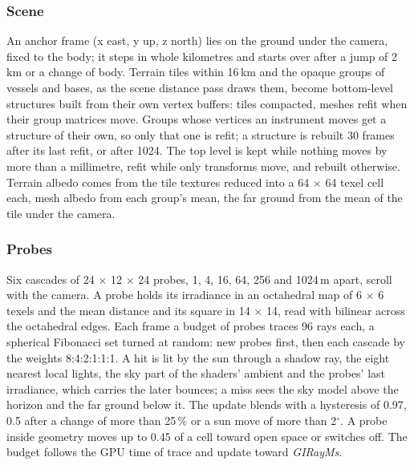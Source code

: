\documentclass[Orbiter Technical Reference.tex]{subfiles}
\begin{document}
\begin{sloppypar}
\subsubsection{Scene}
An anchor frame (x east, y up, z north) lies on the ground under the camera, fixed to the body; it steps in whole kilometres and starts over after a jump of 2\,km or a change of body. Terrain tiles within 16\,km and the opaque groups of vessels and bases, as the scene distance pass draws them, become bottom-level structures built from their own vertex buffers: tiles compacted, meshes refit when their group matrices move. Groups whose vertices an instrument moves get a structure of their own, so only that one is refit; a structure is rebuilt 30 frames after its last refit, or after 1024. The top level is kept while nothing moves by more than a millimetre, refit while only transforms move, and rebuilt otherwise. Terrain albedo comes from the tile textures reduced into a 64 $\times$ 64 texel cell each, mesh albedo from each group's mean, the far ground from the mean of the tile under the camera.

\subsubsection{Probes}
Six cascades of 24 $\times$ 12 $\times$ 24 probes, 1, 4, 16, 64, 256 and 1024\,m apart, scroll with the camera. A probe holds its irradiance in an octahedral map of 6 $\times$ 6 texels and the mean distance and its square in 14 $\times$ 14, read with bilinear across the octahedral edges. Each frame a budget of probes traces 96 rays each, a spherical Fibonacci set turned at random: new probes first, then each cascade by the weights 8:4:2:1:1:1. A hit is lit by the sun through a shadow ray, the eight nearest local lights, the sky part of the shaders' ambient and the probes' last irradiance, which carries the later bounces; a miss sees the sky model above the horizon and the far ground below it. The update blends with a hysteresis of 0.97, 0.5 after a change of more than 25\,\% or a sun move of more than 2$^\circ$. A probe inside geometry moves up to 0.45 of a cell toward open space or switches off. The budget follows the GPU time of trace and update toward \textit{GIRayMs}.


\end{sloppypar}
\end{document}
